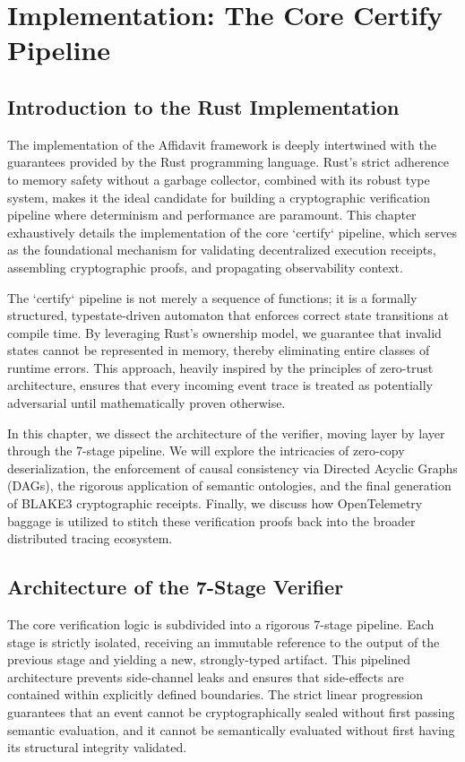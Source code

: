 \chapter{Implementation: The Core Certify Pipeline}
\label{ch:impl_core}

\section{Introduction to the Rust Implementation}
The implementation of the Affidavit framework is deeply intertwined with the guarantees provided by the Rust programming language. Rust's strict adherence to memory safety without a garbage collector, combined with its robust type system, makes it the ideal candidate for building a cryptographic verification pipeline where determinism and performance are paramount. This chapter exhaustively details the implementation of the core `certify` pipeline, which serves as the foundational mechanism for validating decentralized execution receipts, assembling cryptographic proofs, and propagating observability context.

The `certify` pipeline is not merely a sequence of functions; it is a formally structured, typestate-driven automaton that enforces correct state transitions at compile time. By leveraging Rust's ownership model, we guarantee that invalid states cannot be represented in memory, thereby eliminating entire classes of runtime errors. This approach, heavily inspired by the principles of zero-trust architecture, ensures that every incoming event trace is treated as potentially adversarial until mathematically proven otherwise. 

In this chapter, we dissect the architecture of the verifier, moving layer by layer through the 7-stage pipeline. We will explore the intricacies of zero-copy deserialization, the enforcement of causal consistency via Directed Acyclic Graphs (DAGs), the rigorous application of semantic ontologies, and the final generation of BLAKE3 cryptographic receipts. Finally, we discuss how OpenTelemetry baggage is utilized to stitch these verification proofs back into the broader distributed tracing ecosystem.

\section{Architecture of the 7-Stage Verifier}
The core verification logic is subdivided into a rigorous 7-stage pipeline. Each stage is strictly isolated, receiving an immutable reference to the output of the previous stage and yielding a new, strongly-typed artifact. This pipelined architecture prevents side-channel leaks and ensures that side-effects are contained within explicitly defined boundaries. The strict linear progression guarantees that an event cannot be cryptographically sealed without first passing semantic evaluation, and it cannot be semantically evaluated without first having its structural integrity validated.

